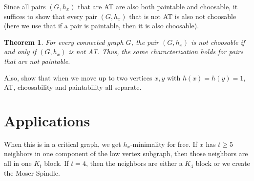\documentclass[12pt]{article}
\theoremstyle{plain}
\newtheorem{thm}{Theorem}[section]
\theoremstyle{definition}
\theoremstyle{remark}
\begin{document}
Since all pairs $(G,h_x)$ that are AT are also both paintable and choosable, it
suffices to show that every pair $(G,h_x)$ that is not AT is also not choosable
(here we use that if a pair is paintable, then it is also choosable).

\begin{thm}
For every connected graph $G$, the pair $(G,h_x)$ is not choosable if and only
if $(G,h_x)$ is not AT.  Thus, the same characterization holds for pairs that
are not paintable.
\end{thm}

Also, show that when we move up to two vertices $x,y$ with $h(x) =
h(y) = 1$, AT, choosability and paintability all
separate.

\section{Applications}
When this is in a critical graph, we get $h_x$-minimality for free.  If $x$ has
$t \ge 5$ neighbors in one component of the low vertex subgraph, then those
neighbors are all in one $K_t$ block.  If $t = 4$, then the neighbors are
either a $K_4$ block or we create the Moser
Spindle.



\end{document}

